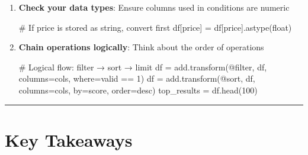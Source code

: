 \documentclass[
  letterpaper,
]{scrbook}
\newenvironment{Shaded}{\begin{snugshade}}{\end{snugshade}}
\newcommand{\BuiltInTok}[1]{\textcolor[rgb]{0.00,0.23,0.31}{#1}}
\newcommand{\CommentTok}[1]{\textcolor[rgb]{0.37,0.37,0.37}{#1}}
\newcommand{\DecValTok}[1]{\textcolor[rgb]{0.68,0.00,0.00}{#1}}
\newcommand{\NormalTok}[1]{\textcolor[rgb]{0.00,0.23,0.31}{#1}}
\newcommand{\OperatorTok}[1]{\textcolor[rgb]{0.37,0.37,0.37}{#1}}
\newcommand{\StringTok}[1]{\textcolor[rgb]{0.13,0.47,0.30}{#1}}
\begin{document}
\begin{enumerate}
\begin{Shaded}
\begin{Highlighting}[]
\CommentTok{\# Less clear}
\NormalTok{where}\OperatorTok{=}\StringTok{\textquotesingle{}stock != 0\textquotesingle{}}  \CommentTok{\# Could include negative values}
\end{Highlighting}
\end{Shaded}
\item
  \textbf{Check your data types}: Ensure columns used in conditions are
  numeric

\begin{Shaded}
\begin{Highlighting}[]
\CommentTok{\# If \textquotesingle{}price\textquotesingle{} is stored as string, convert first}
\NormalTok{df[}\StringTok{\textquotesingle{}price\textquotesingle{}}\NormalTok{] }\OperatorTok{=}\NormalTok{ df[}\StringTok{\textquotesingle{}price\textquotesingle{}}\NormalTok{].astype(}\BuiltInTok{float}\NormalTok{)}
\end{Highlighting}
\end{Shaded}
\item
  \textbf{Chain operations logically}: Think about the order of
  operations

\begin{Shaded}
\begin{Highlighting}[]
\CommentTok{\# Logical flow: filter → sort → limit}
\NormalTok{df }\OperatorTok{=}\NormalTok{ add.transform(}\StringTok{\textquotesingle{}@filter\textquotesingle{}}\NormalTok{, df, columns}\OperatorTok{=}\NormalTok{cols, where}\OperatorTok{=}\StringTok{\textquotesingle{}valid == 1\textquotesingle{}}\NormalTok{)}
\NormalTok{df }\OperatorTok{=}\NormalTok{ add.transform(}\StringTok{\textquotesingle{}@sort\textquotesingle{}}\NormalTok{, df, columns}\OperatorTok{=}\NormalTok{cols, by}\OperatorTok{=}\StringTok{\textquotesingle{}score\textquotesingle{}}\NormalTok{, order}\OperatorTok{=}\StringTok{\textquotesingle{}desc\textquotesingle{}}\NormalTok{)}
\NormalTok{top\_results }\OperatorTok{=}\NormalTok{ df.head(}\DecValTok{100}\NormalTok{)}
\end{Highlighting}
\end{Shaded}
\end{enumerate}

\begin{center}\rule{0.5\linewidth}{0.5pt}\end{center}

\section{Key Takeaways}\label{key-takeaways-6}
\end{document}
